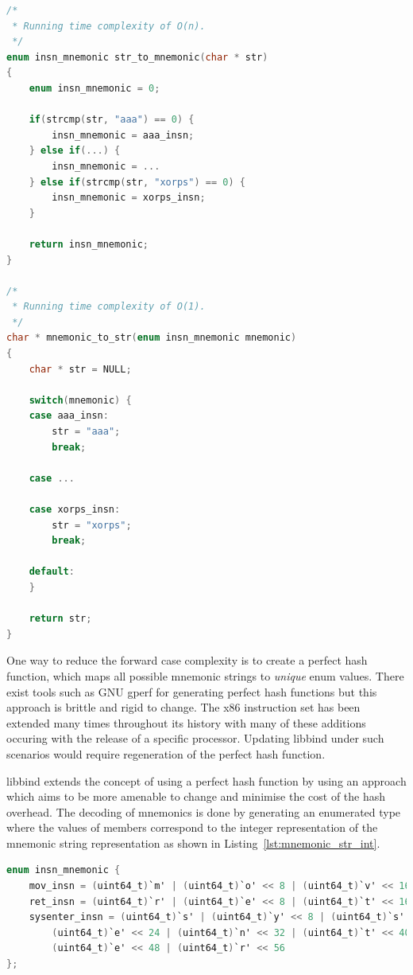 \noindent\begin{minipage}{\textwidth}
\begin{lstlisting}[language=C,caption={Classical implementation for mapping strings to enumerated type and vice versa.},label=lst:classical_enum]
/*
 * Running time complexity of O(n).
 */
enum insn_mnemonic str_to_mnemonic(char * str)
{
	enum insn_mnemonic = 0;
	
	if(strcmp(str, "aaa") == 0) {
		insn_mnemonic = aaa_insn;
	} else if(...) {
		insn_mnemonic = ...
	} else if(strcmp(str, "xorps") == 0) {
		insn_mnemonic = xorps_insn;
	}

	return insn_mnemonic;
}

/*
 * Running time complexity of O(1).
 */
char * mnemonic_to_str(enum insn_mnemonic mnemonic)
{
	char * str = NULL;
	
	switch(mnemonic) {
	case aaa_insn:
		str = "aaa";
		break;
	
	case ...		
	
	case xorps_insn:
		str = "xorps";
		break;

	default:
	}
	
	return str;
}
\end{lstlisting}
\end{minipage}

One way to reduce the forward case complexity is to create a perfect hash function, which maps all possible mnemonic strings to \emph{unique} enum values. There exist tools such as GNU gperf for generating perfect hash functions but this approach is brittle and rigid to change. The x86 instruction set has been extended many times throughout its history with many of these additions occuring with the release of a specific processor. Updating libbind under such scenarios would require regeneration of the perfect hash function.

libbind extends the concept of using a perfect hash function by using an approach which aims to be more amenable to change and minimise the cost of the hash overhead. The decoding of mnemonics is done by generating an enumerated type where the values of members correspond to the integer representation of the mnemonic string representation as shown in Listing~\ref{lst:mnemonic_str_int}.

\noindent\begin{minipage}{\textwidth}
\begin{lstlisting}[language=C,caption={Example mnemonic string and integer representations.},label=lst:mnemonic_str_int]
enum insn_mnemonic {
	mov_insn = (uint64_t)`m' | (uint64_t)`o' << 8 | (uint64_t)`v' << 16,
	ret_insn = (uint64_t)`r' | (uint64_t)`e' << 8 | (uint64_t)`t' << 16,
	sysenter_insn = (uint64_t)`s' | (uint64_t)`y' << 8 | (uint64_t)`s' << 16 |
		(uint64_t)`e' << 24 | (uint64_t)`n' << 32 | (uint64_t)`t' << 40 |
		(uint64_t)`e' << 48 | (uint64_t)`r' << 56
};
\end{lstlisting}
\end{minipage}

